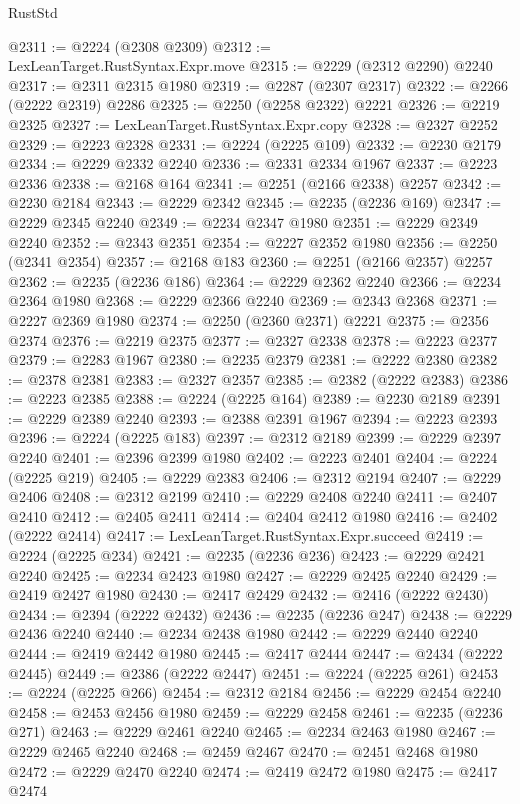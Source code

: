 \begin{lexlean}{RustStd}
\begin{coremodule}
@2311 := @2224 (@2308 @2309)
@2312 := LexLeanTarget.RustSyntax.Expr.move
@2315 := @2229 (@2312 @2290) @2240
@2317 := @2311 @2315 @1980
@2319 := @2287 (@2307 @2317)
@2322 := @2266 (@2222 @2319) @2286
@2325 := @2250 (@2258 @2322) @2221
@2326 := @2219 @2325
@2327 := LexLeanTarget.RustSyntax.Expr.copy
@2328 := @2327 @2252
@2329 := @2223 @2328
@2331 := @2224 (@2225 @109)
@2332 := @2230 @2179
@2334 := @2229 @2332 @2240
@2336 := @2331 @2334 @1967
@2337 := @2223 @2336
@2338 := @2168 @164
@2341 := @2251 (@2166 @2338) @2257
@2342 := @2230 @2184
@2343 := @2229 @2342
@2345 := @2235 (@2236 @169)
@2347 := @2229 @2345 @2240
@2349 := @2234 @2347 @1980
@2351 := @2229 @2349 @2240
@2352 := @2343 @2351
@2354 := @2227 @2352 @1980
@2356 := @2250 (@2341 @2354)
@2357 := @2168 @183
@2360 := @2251 (@2166 @2357) @2257
@2362 := @2235 (@2236 @186)
@2364 := @2229 @2362 @2240
@2366 := @2234 @2364 @1980
@2368 := @2229 @2366 @2240
@2369 := @2343 @2368
@2371 := @2227 @2369 @1980
@2374 := @2250 (@2360 @2371) @2221
@2375 := @2356 @2374
@2376 := @2219 @2375
@2377 := @2327 @2338
@2378 := @2223 @2377
@2379 := @2283 @1967
@2380 := @2235 @2379
@2381 := @2222 @2380
@2382 := @2378 @2381
@2383 := @2327 @2357
@2385 := @2382 (@2222 @2383)
@2386 := @2223 @2385
@2388 := @2224 (@2225 @164)
@2389 := @2230 @2189
@2391 := @2229 @2389 @2240
@2393 := @2388 @2391 @1967
@2394 := @2223 @2393
@2396 := @2224 (@2225 @183)
@2397 := @2312 @2189
@2399 := @2229 @2397 @2240
@2401 := @2396 @2399 @1980
@2402 := @2223 @2401
@2404 := @2224 (@2225 @219)
@2405 := @2229 @2383
@2406 := @2312 @2194
@2407 := @2229 @2406
@2408 := @2312 @2199
@2410 := @2229 @2408 @2240
@2411 := @2407 @2410
@2412 := @2405 @2411
@2414 := @2404 @2412 @1980
@2416 := @2402 (@2222 @2414)
@2417 := LexLeanTarget.RustSyntax.Expr.succeed
@2419 := @2224 (@2225 @234)
@2421 := @2235 (@2236 @236)
@2423 := @2229 @2421 @2240
@2425 := @2234 @2423 @1980
@2427 := @2229 @2425 @2240
@2429 := @2419 @2427 @1980
@2430 := @2417 @2429
@2432 := @2416 (@2222 @2430)
@2434 := @2394 (@2222 @2432)
@2436 := @2235 (@2236 @247)
@2438 := @2229 @2436 @2240
@2440 := @2234 @2438 @1980
@2442 := @2229 @2440 @2240
@2444 := @2419 @2442 @1980
@2445 := @2417 @2444
@2447 := @2434 (@2222 @2445)
@2449 := @2386 (@2222 @2447)
@2451 := @2224 (@2225 @261)
@2453 := @2224 (@2225 @266)
@2454 := @2312 @2184
@2456 := @2229 @2454 @2240
@2458 := @2453 @2456 @1980
@2459 := @2229 @2458
@2461 := @2235 (@2236 @271)
@2463 := @2229 @2461 @2240
@2465 := @2234 @2463 @1980
@2467 := @2229 @2465 @2240
@2468 := @2459 @2467
@2470 := @2451 @2468 @1980
@2472 := @2229 @2470 @2240
@2474 := @2419 @2472 @1980
@2475 := @2417 @2474

\end{coremodule}
\end{lexlean}
